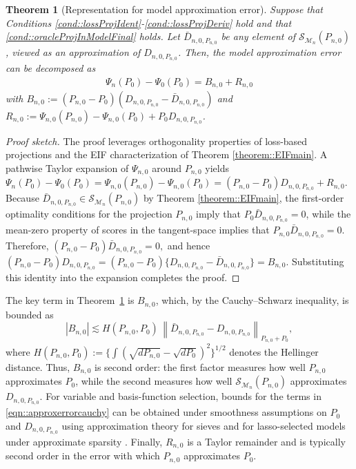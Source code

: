 \documentclass[11pt]{article}
\newtheorem{theorem}{Theorem}
\theoremstyle{definition}
\begin{document}
 
\begin{theorem}[Representation for model approximation error]
  
    Suppose that Conditions \ref{cond::lossProjIdent}-\ref{cond::lossProjDeriv} hold and that \ref{cond::oracleProjInModelFinal} holds.  Let $\bar D_{n,0,P_{n,0}}$ be any element of $ \mathcal{S}_{\mathcal{M}_n}(P_{n,0})$, viewed as an  approximation of $D_{n,0,P_{n,0}}$. Then, the model approximation error can be decomposed as 
    \begin{align*}
        \Psi_n(P_0) - \Psi_0(P_0) = B_{n,0} + R_{n,0} 
    \end{align*} with $B_{n,0}:=(P_{n,0} - P_0)\left( D_{n,0,P_{n,0}} - \bar{D}_{n,0,P_{n,0}} \right)$ and 
   $R_{n,0} :=  \Psi_{n,0}(P_{n,0}) - \Psi_{n,0}(P_0) +  P_0 D_{n,0,P_{n,0}}$.
      \label{theorem::exactBiasOracle}
\end{theorem}
\begin{proof}[Proof sketch]
The proof leverages orthogonality properties of loss-based projections and the EIF characterization of Theorem \ref{theorem::EIFmain}. A pathwise Taylor expansion of $\Psi_{n,0}$ around $P_{n,0}$ yields $\Psi_n(P_0)-\Psi_0(P_0) = \Psi_{n,0}(P_{n,0})-\Psi_{n,0}(P_0) = (P_{n,0}-P_0)D_{n,0,P_{n,0}} + R_{n,0}. $ Because \(\bar{D}_{n,0,P_{n,0}} \in \mathcal{S}_{\mathcal{M}_n}(P_{n,0})\) by Theorem \ref{theorem::EIFmain}, the
first-order optimality conditions for the projection \(P_{n,0}\) imply that
\(P_0\bar{D}_{n,0,P_{n,0}}=0\), while the mean-zero property of scores in the tangent-space
implies that \(P_{n,0}\bar{D}_{n,0,P_{n,0}}=0\). Therefore, $(P_{n,0}-P_0)\bar{D}_{n,0,P_{n,0}}=0,$
and hence $(P_{n,0}-P_0)D_{n,0,P_{n,0}}
=
(P_{n,0}-P_0)\{D_{n,0,P_{n,0}}-\bar{D}_{n,0,P_{n,0}}\}
=
B_{n,0}.$
Substituting this identity into the expansion completes the proof.
\end{proof}
The key term in Theorem~\ref{theorem::exactBiasOracle} is \(B_{n,0}\), which, by the Cauchy--Schwarz inequality, is bounded as
\begin{equation}
\label{eqn::approxerrorcauchy}
|B_{n,0}|
\lesssim
H(P_{n,0}, P_0)\,
\left\|\bar{D}_{n,0,P_{n,0}} - D_{n,0,P_{n,0}}\right\|_{P_{n,0}+P_0},
\end{equation}
where $H(P_{n,0}, P_0)
:=
\{\int (\sqrt{dP_{n,0}} - \sqrt{dP_0})^2 \}^{1/2} $ denotes the Hellinger distance. Thus, \(B_{n,0}\) is second order: the first factor measures how well \(P_{n,0}\) approximates \(P_0\), while the second measures how well \(\mathcal{S}_{\mathcal{M}_n}(P_{n,0})\) approximates \(D_{n,0,P_{n,0}}\). For variable and basis-function selection, bounds for the terms in \eqref{eqn::approxerrorcauchy} can be obtained under smoothness assumptions on \(P_0\) and \(D_{n,0,P_{n,0}}\) using approximation theory for sieves \citep{shen1997methods,spnpsieve, BelloniSieveApprox} and for lasso-selected models under approximate sparsity \citep{belloni2013least, chernoapproxSparse2019}. Finally, \(R_{n,0}\) is a Taylor remainder and is typically second order in the error with which \(P_{n,0}\) approximates \(P_0\).
\end{document}
